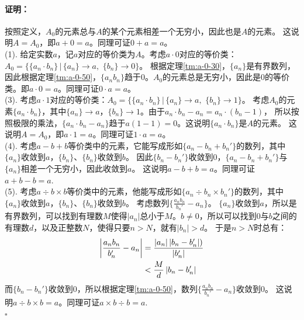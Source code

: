 \documentclass[12pt,UTF8]{ctexbook}
\newenvironment{proof2}{\paragraph{\textbf{证明：}}}{\hfill$\square$}
\begin{document}
\begin{appendix}
\begin{proof2}
    按照定义，$A_0$的元素总与$A$的某个元素相差一个无穷小，因此也是$A$的元素。
    这说明$A = A_0$，即$a + 0 = a$。同理可证$0+a=a$。\\
    (1). 给定实数$a$，记$a$对应的等价类为$A$。考虑$a\cdot 0$对应的等价类：$A_0 = \{ \{a_n \cdot b_n\} \,|\, \{a_n\}\to a, \,\, \{b_n\} \to 0 \}$。
    根据定理\ref{tm:a-0-30}，$\{a_n\}$是有界数列，因此根据定理\ref{tm:a-0-50}，$\{a_nb_n\}$趋于$0$。$A_0$的元素总是无穷小，因此是$0$的等价类。即$a \cdot 0 = a$。同理可证$0\cdot a=a$。\\
    (3). 考虑$a\cdot 1$对应的等价类：$A_0 = \{\{a_n \cdot b_n\} \,|\, \{a_n\}\to a, \,\, \{b_n\} \to 1 \}$。
    考虑$A_0$的元素$\{a_n \cdot b_n\}$，其中$\{a_n\}\to a$，$\{b_n\} \to 1$。由于$a_n \cdot b_n - a_n = a_n \cdot (b_n - 1)$，
    所以按照极限的乘法，$\{a_n \cdot b_n - a_n\}$趋于$a(1 - 1) = 0$。这说明$\{a_n \cdot b_n\}$是$A$的元素。
    这说明$A = A_0$，即$a \cdot 1 = a$。同理可证$1 \cdot a = a$。\\
    (4). 考虑$a - b + b$等价类中的元素，它能写成形如$\{a_n - b_n + b_n'\}$的数列，其中$\{a_n\}$收敛到$a$，$\{b_n\}$、$\{b_n\}$收敛到$b$。
    因此$\{b_n - b_n'\}$收敛到$0$，$\{a_n - b_n + b_n'\}$与$\{a_n\}$相差一个无穷小，因此收敛到$a$。
    这说明$a - b + b = a$。同理可证$a + b - b = a.$\\
    (5). 考虑$a \div b \times b$等价类中的元素，他能写成形如$\{a_n \div b_n \times b_n'\}$的数列，其中$\{a_n\}$收敛到$a$，$\{b_n\}$、$\{b_n\}$收敛到$b$。
    考虑数列$\{\frac{a_n b_n}{b_n'} - a_n\}$。
    $\{a_n\}$收敛到$a$，所以是有界数列，可以找到有理数$M$使得$|a_n|$总小于$M$。$b\neq 0$，所以可以找到$0$与$b$之间的有理数$d$，以及正整数$N$，使得只要$n>N$，就有$|b_n| > d$。
    于是$n>N$时总有：
    \begin{align}
        \left|\frac{a_n b_n}{b_n'} - a_n\right| &= \frac{\left|a_n\right| \left|b_n - b_n'\right|)}{\left|b_n'\right|} \notag \\
        &< \frac{M}{d}\left|b_n - b_n'\right| \notag
    \end{align}
    而$\{b_n - b_n'\}$收敛到$0$，所以根据定理\ref{tm:a-0-50}，数列$\{\frac{a_n b_n}{b_n'} - a_n\}$收敛到$0$。
    这说明$a \div b \times b = a$。同理可证$a\times b \div b = a.$\\
\end{proof2}


\end{appendix}
\end{document}
